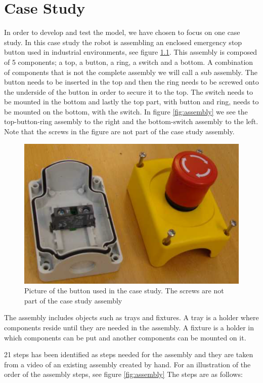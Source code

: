 \chapter{Case Study}\label{cha:assembly}
In order to develop and test the model, we have chosen to focus on one case study. In this case study the robot is assembling an enclosed emergency stop button used in industrial environments, see figure \ref{fig:button}. This assembly is composed of 5 components; a top, a button, a ring, a switch and a bottom. A combination of components that is not the complete assembly we will call a sub assembly. The button needs to be inserted in the top and then the ring needs to be screwed onto the underside of the button in order to secure it to the top. The switch needs to be mounted in the bottom and lastly the top part, with button and ring, needs to be mounted on the bottom, with the switch. In figure \ref{fig:assembly} we see the top-button-ring assembly to the right and the bottom-switch assembly to the left. Note that the screws in the figure are not part of the case study assembly.

\begin{figure}
\centering
\includegraphics[width=\textwidth/3*2]{Figures/buttonbox.png}
\caption{Picture of the button used in the case study. The screws are not part of the case study assembly}
\label{fig:button}
\end{figure}

The assembly includes objects such as trays and fixtures. A tray is a holder where components reside until they are needed in the assembly. A fixture is a holder in which components can be put and another components can be mounted on it.

21 steps has been identified as steps needed for the assembly and they are taken from a video of an existing assembly created by hand. For an illustration of the order of the assembly steps, see figure \ref{fig:assembly} The steps are as follows:

